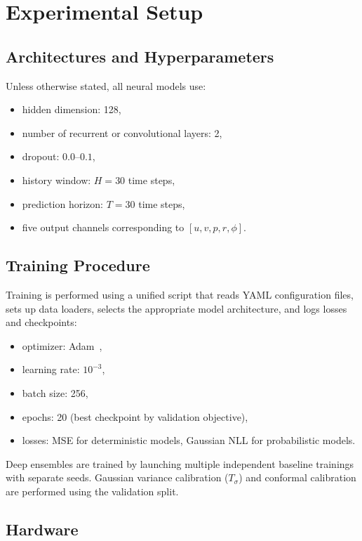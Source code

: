 \documentclass[a4paper,fleqn]{cas-sc}
\begin{document}
\section{Experimental Setup}

\subsection{Architectures and Hyperparameters}

Unless otherwise stated, all neural models use:
\begin{itemize}
    \item hidden dimension: 128,
    \item number of recurrent or convolutional layers: 2,
    \item dropout: \(0.0\)–\(0.1\),
    \item history window: \(H=30\) time steps,
    \item prediction horizon: \(T=30\) time steps,
    \item five output channels corresponding to \([u, v, p, r, \phi]\).
\end{itemize}

\subsection{Training Procedure}

Training is performed using a unified script that reads YAML configuration files, sets up data loaders, selects the appropriate model architecture, and logs losses and checkpoints:
\begin{itemize}
    \item optimizer: Adam~\cite{kingma2015adam},
    \item learning rate: \(10^{-3}\),
    \item batch size: 256,
    \item epochs: 20 (best checkpoint by validation objective),
    \item losses: MSE for deterministic models, Gaussian NLL for probabilistic models.
\end{itemize}

Deep ensembles are trained by launching multiple independent baseline trainings with separate seeds. Gaussian variance calibration (\(T_\sigma\)) and conformal calibration are performed using the validation split.

\subsection{Hardware}
\end{document}
